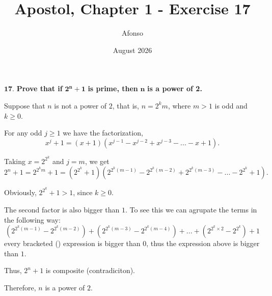 \documentclass{article}
\title{Apostol, Chapter 1 - Exercise 17}
\author{Afonso }
\date{August 2026}
\begin{document}
\maketitle

$\mathbf{17.}$ \textbf{Prove that if} $\mathbf{2^n+1}$ \textbf{is prime, then} $\mathbf{n}$ \textbf{is a power of 2.}

Suppose that $n$ is not a power of $2$, that is, $n=2^km$, where $m>1$ is odd and $k \geq 0$.

For any odd $j \geq 1$ we have the factorization,
$$x^j+1=(x+1)(x^{j-1}-x^{j-2}+x^{j-3}-...-x+1).$$

Taking $x=2^{2^k}$ and $j=m$, we get
$$2^n+1=2^{2^km}+1=(2^{2^k}+1)(2^{2^k(m-1)}-2^{2^k(m-2)}+2^{2^k(m-3)}-...-2^{2^k}+1).$$

Obviously, $2^{2^k}+1>1$, since $k \geq 0$.

The second factor is also bigger than $1$. To see this we can agrupate the terms in the following way:
$$(2^{2^k(m-1)}-2^{2^k(m-2)})+(2^{2^k(m-3)}-2^{2^k(m-4)})+...+(2^{2^k\times2}-2^{2^k})+1$$
every bracketed () expression is bigger than $0$, thus the expression above is bigger than $1$.

Thus, $2^n+1$ is composite (contradiciton).

Therefore, $n$ is a power of $2$.
\end{document}
